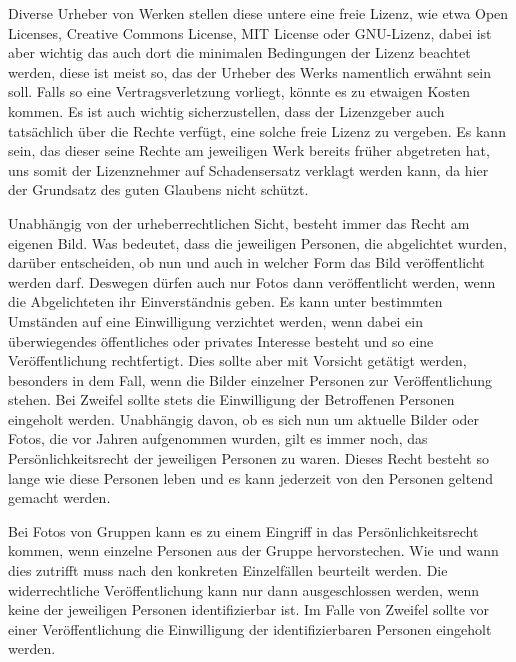 Diverse Urheber von Werken stellen diese untere eine freie Lizenz, wie etwa Open Licenses, Creative Commons License, MIT License
oder GNU-Lizenz, dabei ist aber wichtig das auch dort die minimalen Bedingungen der Lizenz beachtet werden, diese
ist meist so, das der Urheber des Werks namentlich erwähnt sein soll.
Falls so eine Vertragsverletzung vorliegt, könnte es zu etwaigen Kosten kommen.
Es ist auch wichtig sicherzustellen, dass der Lizenzgeber auch tatsächlich über die Rechte verfügt, eine solche freie
Lizenz zu vergeben.
Es kann sein, das dieser seine Rechte am jeweiligen Werk bereits früher abgetreten hat, uns somit der Lizenznehmer auf
Schadensersatz verklagt werden kann, da hier der Grundsatz des guten Glaubens nicht schützt.





Unabhängig von der urheberrechtlichen Sicht, besteht immer das Recht am eigenen Bild.
Was bedeutet, dass die jeweiligen Personen, die abgelichtet wurden, darüber entscheiden,
ob nun und auch in welcher Form das Bild veröffentlicht werden darf.
Deswegen dürfen auch nur Fotos dann veröffentlicht werden, wenn die Abgelichteten ihr Einverständnis geben.
\newline\newline
Es kann unter bestimmten Umständen auf eine Einwilligung verzichtet werden, wenn dabei ein überwiegendes
öffentliches oder privates Interesse besteht und so eine Veröffentlichung rechtfertigt.
Dies sollte aber mit Vorsicht getätigt werden, besonders in dem Fall, wenn die Bilder einzelner Personen zur
Veröffentlichung stehen.
Bei Zweifel sollte stets die Einwilligung der Betroffenen Personen eingeholt werden.
Unabhängig davon, ob es sich nun um aktuelle Bilder oder Fotos, die vor Jahren aufgenommen wurden, gilt es immer noch,
das Persönlichkeitsrecht der jeweiligen Personen zu waren.
Dieses Recht besteht so lange wie diese Personen leben und es kann jederzeit von den Personen geltend gemacht werden.

\label{gruppenfotos}
Bei Fotos von Gruppen kann es zu einem Eingriff in das Persönlichkeitsrecht kommen, wenn einzelne Personen aus der Gruppe hervorstechen.
Wie und wann dies zutrifft muss nach den konkreten Einzelfällen beurteilt werden.
Die widerrechtliche Veröffentlichung kann nur dann ausgeschlossen werden, wenn keine der jeweiligen Personen identifizierbar ist.
Im Falle von Zweifel sollte vor einer Veröffentlichung die Einwilligung der identifizierbaren Personen eingeholt werden.

